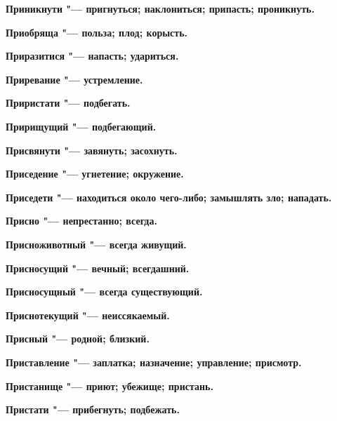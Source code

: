 \begin{multicols}{2}
\bfseries Приникнути\normalfont{} "--- пригнуться; наклониться; припасть; проникнуть. 




\bfseries Приобряща\normalfont{} "--- польза; плод; корысть. 




\bfseries Приразитися\normalfont{} "--- напасть; удариться. 




\bfseries Приревание\normalfont{} "--- устремление. 




\bfseries Приристати\normalfont{} "--- подбегать. 




\bfseries Пририщущий\normalfont{} "--- подбегающий. 




\bfseries Присвянути\normalfont{} "--- завянуть; засохнуть. 




\bfseries Приседение\normalfont{} "--- угнетение; окружение. 




\bfseries Приседети\normalfont{} "--- находиться около чего-либо; замышлять зло; нападать. 




\bfseries Присно\normalfont{} "--- непрестанно; всегда. 




\bfseries Присноживотный\normalfont{} "--- всегда живущий. 




\bfseries Присносущий\normalfont{} "--- вечный; всегдашний. 




\bfseries Присносущный\normalfont{} "--- всегда существующий. 




\bfseries Приснотекущий\normalfont{} "--- неиссякаемый. 




\bfseries Присный\normalfont{} "--- родной; близкий. 




\bfseries Приставление\normalfont{} "--- заплатка; назначение; управление; присмотр. 




\bfseries Пристанище\normalfont{} "--- приют; убежище; пристань. 




\bfseries Пристати\normalfont{} "--- прибегнуть; подбежать. 





\end{multicols}
